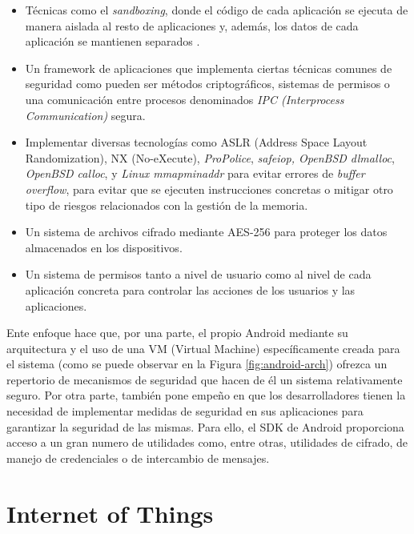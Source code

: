 \begin{itemize}
	\item Técnicas como el \emph{sandboxing}, donde el código de cada aplicación se ejecuta de manera aislada al resto de aplicaciones y, además, los datos de cada aplicación se mantienen separados \cite{jspdcp-2014}. 
	\item Un framework de aplicaciones que implementa ciertas técnicas comunes de seguridad como pueden ser métodos criptográficos, sistemas de permisos o una comunicación entre procesos denominados \textit{IPC (Interprocess Communication)} segura.	
	\item Implementar diversas tecnologías como ASLR (Address Space Layout Randomization), NX (No-eXecute), \textit{ProPolice}, \textit{safe\textunderscore iop, OpenBSD dlmalloc}, \textit{OpenBSD calloc}, y \textit{Linux mmap\textunderscore min\textunderscore addr} para evitar errores de \textit{buffer overflow}, para evitar que se ejecuten instrucciones concretas o mitigar otro tipo de riesgos relacionados con la gestión de la memoria.
	\item Un sistema de archivos cifrado mediante AES-256 para proteger los datos almacenados en los dispositivos.
	\item Un sistema de permisos tanto a nivel de usuario como al nivel de cada aplicación concreta para controlar las acciones de los usuarios y las aplicaciones.
\end{itemize}

Ente enfoque hace que, por una parte, el propio Android mediante su arquitectura y el uso de una VM (Virtual Machine) específicamente creada para el sistema (como se puede observar en la Figura \ref{fig:android-arch}) ofrezca un repertorio de mecanismos de seguridad que hacen de él un sistema relativamente seguro. Por otra parte, también pone empeño en que los desarrolladores tienen la necesidad de implementar medidas de seguridad en sus aplicaciones para garantizar la seguridad de las mismas. Para ello, el SDK de Android proporciona acceso a un gran numero de utilidades como, entre otras, utilidades de cifrado, de manejo de credenciales o de intercambio de mensajes.


\section{Internet of Things}

